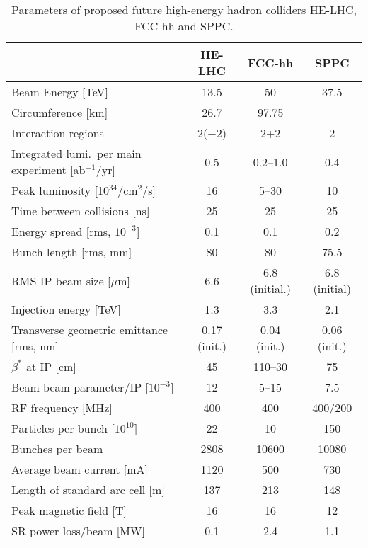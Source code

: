 \begin{table}[htbp]
\caption{Parameters of proposed future high-energy hadron colliders HE-LHC, FCC-hh and SPPC.
\label{tab:ppcoll}
}
\begin{center}
\begin{tabular}{lccc}
\hline\hline
&  HE-LHC & FCC-hh & SPPC  \\
\hline
Beam Energy [TeV]&
        13.5 & {50} &
        {37.5}\\
Circumference [km] &
        26.7 & {97.75} &\\
Interaction regions  &
	 2(+2) & 2+2 &	
        {2}   \\ \hline
Integrated lumi.\ per main experiment [ab$^{-1}$/yr]  &
0.5 & 
        {0.2--1.0} &
        {0.4}  
         \\ 
Peak luminosity [10$^{34}$/cm$^{2}$/s] & 
16 & 
        {5--30}&  
        {10} 
 \\
Time between collisions [ns]&
25 & 25 & 25 \\
Energy spread [rms, $10^{-3}$]&
0.1 &
        {0.1} &
        {0.2} \\
Bunch length [rms, mm]&
80 & 
        {80}&
        {75.5} \\
RMS IP beam size [$\mu$m]&
6.6 &
        {6.8 (initial.)}& 
        {6.8 (initial)}
 \\
Injection energy [TeV]&
1.3 & 
	{3.3}&
	{2.1}  \\ 
Transverse geometric emittance [rms, nm]&
0.17 (init.) & 
        {0.04 (init.)}&
        {0.06 (init.)}
        \\ 
$\beta^*$ at IP [cm] &
45 & 
        {110--30 }&        
        {75} \\ \hline
Beam-beam parameter/IP [$10^{-3}]$ &
12 & 
         {5--15}&
         {7.5}\\
RF frequency [MHz]&
400 & 
	{400}&
	{400/200} \\
Particles per bunch [$10^{10}]$ &
22 & 
        {10}&
        {15}0 \\
Bunches per beam  &
2808 & 
        {10600}&
        {10080} \\
Average beam current [mA]  &
1120 & 
        {500}&
        {730}\\
Length of standard arc cell [m]  &
137 & 
        {213}&
        {148}\\ \hline
Peak magnetic field [T]  &
16 & 
        {16}&
        {12}\\
SR power loss/beam  [MW] &
0.1 & 
	{2.4}&
	{1.1} \\ \hline\hline
	\end{tabular}
	\end{center}
\end{table}

